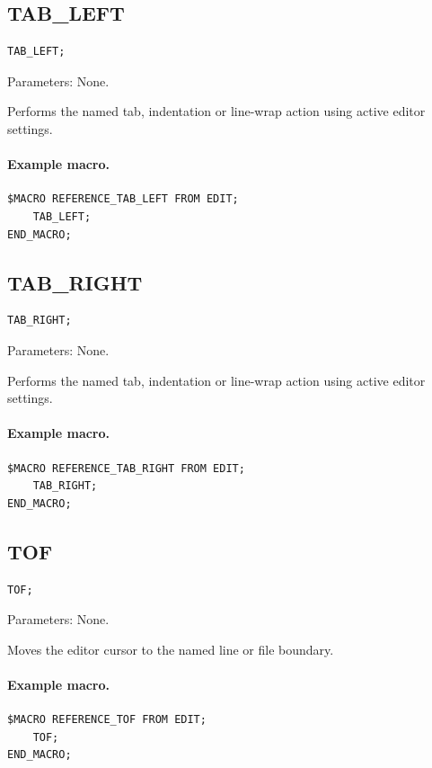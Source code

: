 \documentclass[a4paper,10pt,twoside,openany]{book}
\begin{document}
\label{prim:procedure-tab-left}
\subsection*{TAB\_LEFT}
\begin{verbatim}
TAB_LEFT;
\end{verbatim}
Parameters: None.

Performs the named tab, indentation or line-wrap action using active editor settings.

\paragraph{Example macro.}
\begin{verbatim}
$MACRO REFERENCE_TAB_LEFT FROM EDIT;
    TAB_LEFT;
END_MACRO;
\end{verbatim}

\label{prim:procedure-tab-right}
\subsection*{TAB\_RIGHT}
\begin{verbatim}
TAB_RIGHT;
\end{verbatim}
Parameters: None.

Performs the named tab, indentation or line-wrap action using active editor settings.

\paragraph{Example macro.}
\begin{verbatim}
$MACRO REFERENCE_TAB_RIGHT FROM EDIT;
    TAB_RIGHT;
END_MACRO;
\end{verbatim}

\label{prim:procedure-tof}
\subsection*{TOF}
\begin{verbatim}
TOF;
\end{verbatim}
Parameters: None.

Moves the editor cursor to the named line or file boundary.

\paragraph{Example macro.}
\begin{verbatim}
$MACRO REFERENCE_TOF FROM EDIT;
    TOF;
END_MACRO;
\end{verbatim}
\end{document}
